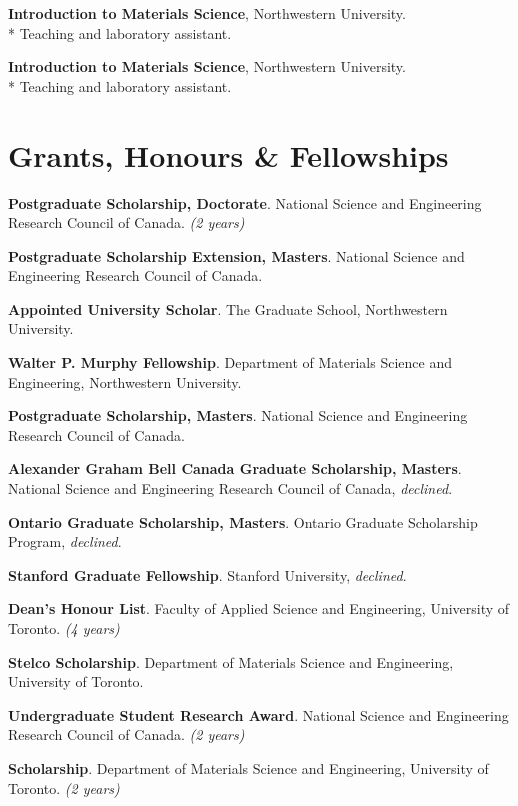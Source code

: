 \textbf{Introduction to Materials Science}, Northwestern University.\\*
Teaching and laboratory assistant.

\textbf{Introduction to Materials Science}, Northwestern University.\\*
Teaching and laboratory assistant.
\endgroup

\section*{Grants, Honours \& Fellowships}
\textbf{Postgraduate Scholarship, Doctorate}. National Science and Engineering Research Council of Canada. \emph{(2 years)}

\begingroup\setlength{\parskip}{0.1cm}
\textbf{Postgraduate Scholarship Extension, Masters}. National Science and Engineering Research Council of Canada.

\textbf{Appointed University Scholar}. The Graduate School, Northwestern University.

\textbf{Walter P. Murphy Fellowship}. Department of Materials Science and Engineering, Northwestern University.

\textbf{Postgraduate Scholarship, Masters}. National Science and Engineering Research Council of Canada.

\textbf{Alexander Graham Bell Canada Graduate Scholarship, Masters}. National Science and Engineering Research Council of Canada, \emph{declined}.

\textbf{Ontario Graduate Scholarship, Masters}. Ontario Graduate Scholarship Program, \emph{declined}.

\textbf{Stanford Graduate Fellowship}. Stanford University, \emph{declined}.

\textbf{Dean's Honour List}. Faculty of Applied Science and Engineering, University of Toronto. \emph{(4 years)}

\textbf{Stelco Scholarship}. Department of Materials Science and Engineering, University of Toronto.

\textbf{Undergraduate Student Research Award}. National Science and Engineering Research Council of Canada. \emph{(2 years)}

\textbf{Scholarship}. Department of Materials Science and Engineering, University of Toronto. \emph{(2 years)}

